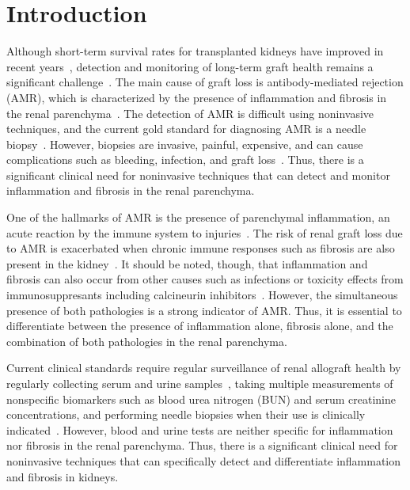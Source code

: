 \section{Introduction}

Although short-term survival rates for transplanted kidneys have improved in recent years~\cite{saritas_Kidney_2021}, detection and monitoring of long-term graft health remains a significant challenge~\cite{poggio_Longterm_2021}. The main cause of graft loss is antibody-mediated rejection (AMR), which is characterized by the presence of inflammation and fibrosis in the renal parenchyma~\cite{loupy_Outcome_2009,nankivell_Rejection_2010}. The detection of AMR is difficult using noninvasive techniques, and the current gold standard for diagnosing AMR is a needle biopsy~\cite{alexandre_AntibodyMediated_2018}. However, biopsies are invasive, painful, expensive, and can cause complications such as bleeding, infection, and graft loss~\cite{schinstock_Value_2017}. Thus, there is a significant clinical need for noninvasive techniques that can detect and monitor inflammation and fibrosis in the renal parenchyma.

One of the hallmarks of AMR is the presence of parenchymal inflammation, an acute reaction by the immune system to injuries~\cite{loupy_Banff_2020,mannon_Inflammation_2010,alexandre_AntibodyMediated_2018}. The risk of renal graft loss due to AMR is exacerbated when chronic immune responses such as fibrosis are also present in the kidney~\cite{venner_Relationships_2016, mannon_Inflammation_2010, saritas_Kidney_2021}. It should be noted, though, that inflammation and fibrosis can also occur from other causes such as infections or toxicity effects from immunosuppresants including calcineurin inhibitors~\cite{naesens_Proteinuria_2016, callemeyn_Revisiting_2021}. However, the simultaneous presence of both pathologies is a strong indicator of AMR. Thus, it is essential to differentiate between the presence of inflammation alone, fibrosis alone, and the combination of both pathologies in the renal parenchyma.

Current clinical standards require regular surveillance of renal allograft health by regularly collecting serum and urine samples~\cite{naesens_Proteinuria_2016}, taking multiple measurements of nonspecific biomarkers such as blood urea nitrogen (BUN) and serum creatinine concentrations, and performing needle biopsies when their use is clinically indicated~\cite{loupy_Banff_2020, schinstock_Value_2017}. However, blood and urine tests are neither specific for inflammation nor fibrosis in the renal parenchyma. Thus, there is a significant clinical need for noninvasive techniques that can specifically detect and differentiate inflammation and fibrosis in kidneys.

